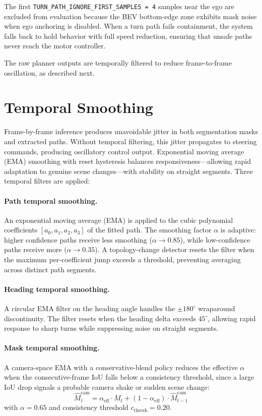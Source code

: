 \documentclass[12pt,letterpaper,oneside]{report}
\begin{document}
The first \texttt{TURN\_PATH\_IGNORE\_FIRST\_SAMPLES\,=\,4} samples near the ego are excluded from evaluation because the BEV bottom-edge zone exhibits mask noise when ego anchoring is disabled. When a turn path fails containment, the system falls back to hold behavior with full speed reduction, ensuring that unsafe paths never reach the motor controller.

The raw planner outputs are temporally filtered to reduce frame-to-frame oscillation, as described next.


\section{Temporal Smoothing}
\label{sec:temporal_smoothing}

Frame-by-frame inference produces unavoidable jitter in both segmentation masks and extracted paths. Without temporal filtering, this jitter propagates to steering commands, producing oscillatory control output. Exponential moving average (EMA) smoothing with reset hysteresis balances responsiveness---allowing rapid adaptation to genuine scene changes---with stability on straight segments. Three temporal filters are applied:

\paragraph{Path temporal smoothing.}
An exponential moving average (EMA) is applied to the cubic polynomial coefficients $[a_0, a_1, a_2, a_3]$ of the fitted path. The smoothing factor $\alpha$ is adaptive: higher confidence paths receive less smoothing ($\alpha \to 0.85$), while low-confidence paths receive more ($\alpha \to 0.35$). A topology-change detector resets the filter when the maximum per-coefficient jump exceeds a threshold, preventing averaging across distinct path segments.

\paragraph{Heading temporal smoothing.}
A circular EMA filter on the heading angle handles the $\pm 180^\circ$ wraparound discontinuity. The filter resets when the heading delta exceeds $45^\circ$, allowing rapid response to sharp turns while suppressing noise on straight segments.

\paragraph{Mask temporal smoothing.}
A camera-space EMA with a conservative-blend policy reduces the effective $\alpha$ when the consecutive-frame IoU falls below a consistency threshold, since a large IoU drop signals a probable camera shake or sudden scene change:
\begin{equation}
\hat{M}_t^{\text{cam}} = \alpha_{\text{eff}} \cdot M_t + (1 - \alpha_{\text{eff}}) \cdot \hat{M}_{t-1}^{\text{cam}}
\end{equation}
with $\alpha = 0.65$ and consistency threshold $c_\text{thresh} = 0.20$.
\end{document}
